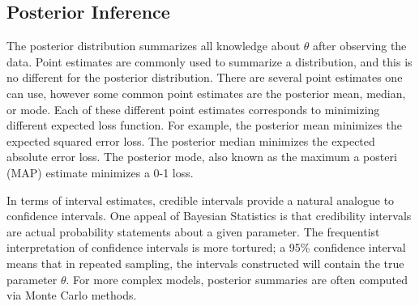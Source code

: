 \subsection{Posterior Inference}
The posterior distribution summarizes all knowledge about $\theta$ after observing the data. 
Point estimates are commonly used to summarize a distribution, and this is no different for the posterior distribution.  
There are several point estimates one can use, however some common point estimates are the posterior mean, median, or mode.  
Each of these different point estimates corresponds to minimizing different expected loss function.  
For example, the posterior mean minimizes the expected squared error loss.  
The posterior median minimizes the expected absolute error loss.  
The posterior mode, also known as the maximum a posteri (MAP) estimate minimizes a 0-1 loss.  

In terms of interval estimates, credible intervals provide a natural analogue to confidence intervals. 
One appeal of Bayesian Statistics is that credibility intervals are actual probability statements about a given parameter.  
The frequentist interpretation of confidence intervals is more tortured; a 95\% confidence interval means that in repeated sampling, the intervals constructed will contain the true parameter \(\theta\)\cite{wackerly_mathematical_2008}.  
For more complex models, posterior summaries are often computed via Monte Carlo methods.